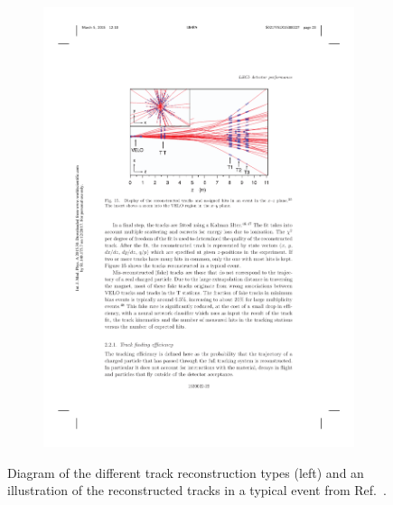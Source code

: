 \begin{figure}[!h]
\begin{subfigure}[m]{0.4\textwidth}
        \includegraphics[width=1.0\textwidth]{figs/Detector/reco_track_reco.pdf}
    \end{subfigure}
    \caption{Diagram of the different track reconstruction types (left) and an illustration of the reconstructed tracks in a typical event from Ref.~\cite{LHCb-DP-2014-002}.}
    \label{fig:Dec_reco_tracks}   
\end{figure}


